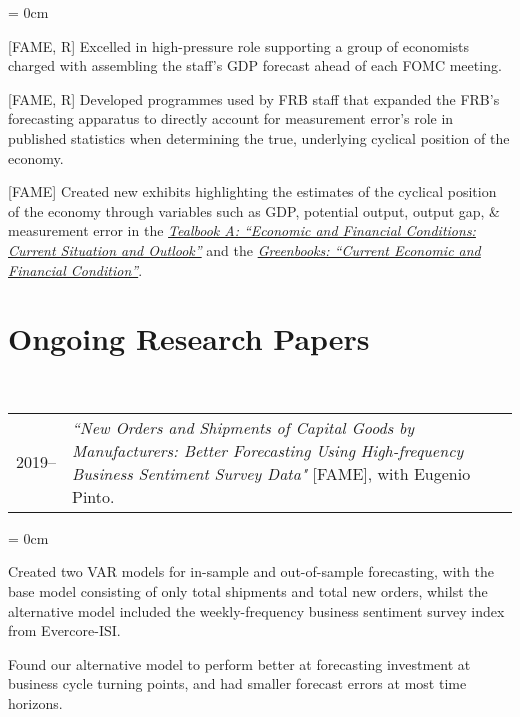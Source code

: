 \documentclass[a4paper, 11pt]{article}
\begin{document}
    \begin{compactitem}\parskip = 0cm
      \item {[FAME, R]} Excelled in high-pressure role supporting a group of economists charged with assembling the staff's GDP forecast ahead of each FOMC meeting.
      \item {[FAME, R]} Developed programmes used by FRB staff that expanded the FRB's forecasting apparatus to directly account for measurement error's role in published statistics when determining the true, underlying cyclical position of the economy.
      \item {[FAME]} Created new exhibits highlighting the estimates of the cyclical position of the economy through variables such as GDP, potential output, output gap, \& measurement error in the \href{https://www.federalreserve.gov/monetarypolicy/fomc_historical.htm#tealbooks}{\textit{Tealbook A: ``Economic and Financial Conditions: Current Situation and Outlook''}} and the \href{https://www.federalreserve.gov/monetarypolicy/fomc_historical.htm#greenbooks}{\textit{Greenbooks: ``Current Economic and Financial Condition''}}.
    \end{compactitem}

  \section{Ongoing Research Papers}
    ~\begin{tabular}{lP{15cm}}
      2019--& \textit{``New Orders and Shipments of Capital Goods by Manufacturers: Better Forecasting Using} \textit{High-frequency Business Sentiment Survey Data"} {[FAME]}, with Eugenio Pinto.
    \end{tabular}

    \begin{compactitem}\parskip = 0cm
      \item Created two VAR models for in-sample and out-of-sample forecasting, with the base model consisting of only total shipments and total new orders, whilst the alternative model included the weekly-frequency business sentiment survey index from Evercore-ISI.
      \item Found our alternative model to perform better at forecasting investment at business cycle turning points, and had smaller forecast errors at most time horizons.
    \end{compactitem}
\end{document}
